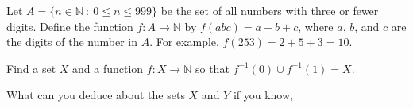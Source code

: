 \documentclass[11pt]{exam}
\def\N{\mathbb{N}}
\def\st{~:~}
\def\inv{^{-1}}
\begin{document}
\begin{questions}

\question Let $A = \{n \in \N \st 0 \le n \le 999\}$ be the set of all numbers with three or fewer digits.  Define the function $f:A \to \N$ by $f(abc) = a+b+c$, where $a$, $b$, and $c$ are the digits of the number in $A$.  For example, $f(253) = 2 + 5 + 3 =  10$.

\question Find a set $X$ and a function $f:X \to \N$ so that $f\inv(0) \cup f\inv(1) = X$.

\question What can you deduce about the sets $X$ and $Y$ if you know,


\end{questions}
\end{document}
